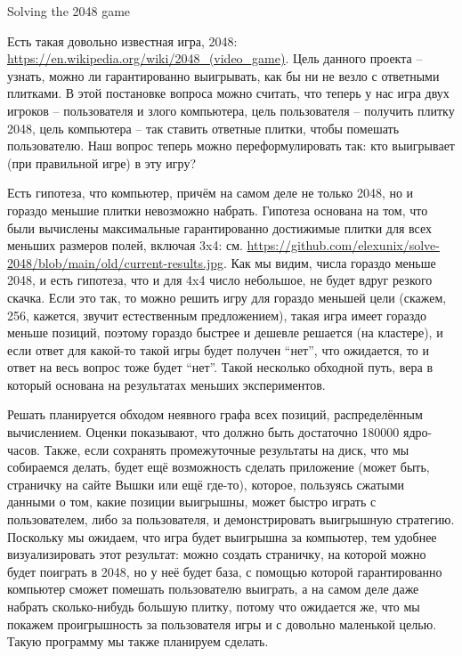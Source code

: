 \documentclass[a4paper,12pt]{article}
\begin{document}
\begin{center} \Large Solving the 2048 game \end{center}
\vspace{30pt}

Есть такая довольно известная игра, 2048: \url{https://en.wikipedia.org/wiki/2048_(video_game)}.
Цель данного проекта -- узнать, можно ли гарантированно выигрывать, как бы ни не везло с ответными плитками. В этой постановке вопроса можно считать, что теперь у нас игра двух игроков -- пользователя и злого компьютера, цель пользователя -- получить плитку 2048, цель компьютера -- так ставить ответные плитки, чтобы помешать пользователю. Наш вопрос теперь можно переформулировать так: кто выигрывает (при правильной игре) в эту игру?

Есть гипотеза, что компьютер, причём на самом деле не только 2048, но и гораздо меньшие плитки невозможно набрать. Гипотеза основана на том, что были вычислены максимальные гарантированно достижимые плитки для всех меньших размеров полей, включая 3x4: см. \url{https://github.com/elexunix/solve-2048/blob/main/old/current-results.jpg}. Как мы видим, числа гораздо меньше 2048, и есть гипотеза, что и для 4x4 число небольшое, не будет вдруг резкого скачка. Если это так, то можно решить игру для гораздо меньшей цели (скажем, 256, кажется, звучит естественным предложением), такая игра имеет гораздо меньше позиций, поэтому гораздо быстрее и дешевле решается (на кластере), и если ответ для какой-то такой игры будет получен ``нет'', что ожидается, то и ответ на весь вопрос тоже будет ``нет''. Такой несколько обходной путь, вера в который основана на результатах меньших экспериментов.

Решать планируется обходом неявного графа всех позиций, распределённым вычислением. Оценки показывают, что должно быть достаточно 180000 ядро-часов. Также, если сохранять промежуточные результаты на диск, что мы собираемся делать, будет ещё возможность сделать приложение (может быть, страничку на сайте Вышки или ещё где-то), которое, пользуясь сжатыми данными о том, какие позиции выигрышны, может быстро играть с пользователем, либо за пользователя, и демонстрировать выигрышную стратегию. Поскольку мы ожидаем, что игра будет выигрышна за компьютер, тем удобнее визуализировать этот результат: можно создать страничку, на которой можно будет поиграть в 2048, но у неё будет база, с помощью которой гарантированно компьютер сможет помешать пользователю выиграть, а на самом деле даже набрать сколько-нибудь большую плитку, потому что ожидается же, что мы покажем проигрышность за пользователя игры и с довольно маленькой целью. Такую программу мы также планируем сделать.
\end{document}
